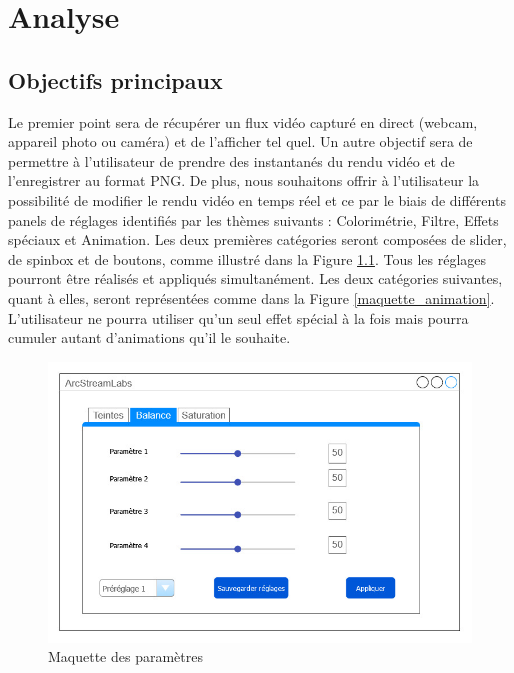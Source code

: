 \chapter{Analyse}

\section{Objectifs principaux}

Le premier point sera de récupérer un flux vidéo capturé en direct (webcam, appareil photo ou caméra) et de l'afficher tel quel.
Un autre objectif sera de permettre à l'utilisateur de prendre des instantanés du rendu vidéo et de l'enregistrer au format PNG.
De plus, nous souhaitons offrir à l'utilisateur la possibilité de modifier le rendu vidéo en temps réel et ce par le biais de différents panels de réglages identifiés par les thèmes suivants : Colorimétrie, Filtre, Effets spéciaux et Animation.
Les deux premières catégories seront composées de slider, de spinbox et de boutons, comme illustré dans la Figure \ref{maquette_parametres}. Tous les réglages pourront être réalisés et appliqués simultanément. 
Les deux catégories suivantes, quant à elles, seront représentées comme dans la Figure \ref{maquette_animation}. L'utilisateur ne pourra utiliser qu'un seul effet spécial à la fois mais pourra cumuler autant d'animations qu'il le souhaite.

\begin{figure}[h]
  \centering
  \includegraphics[width=\textwidth]{./images/P2_Maquette_Parametres.jpg}
  \caption{Maquette des paramètres}
  \label{maquette_parametres}
\end{figure}

